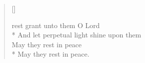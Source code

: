 \newHymn


\begin{verse}[\versewidth]

 rest grant unto them O Lord\\*
And let perpetual light shine upon them\\
May they rest in peace\\*
May they rest in peace.

\end{verse}
